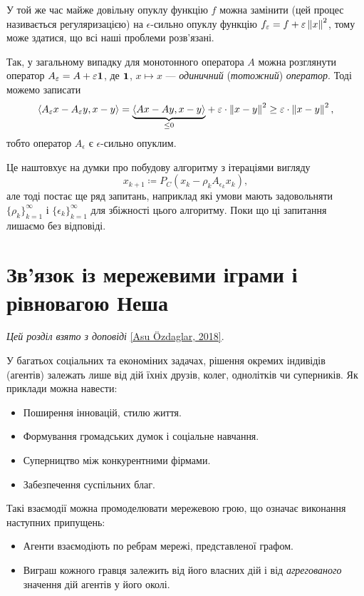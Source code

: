 У той же час майже довільну опуклу функцію $f$ можна замінити (цей процес називається регуляризацією) на $\epsilon$-сильно опуклу функцію $f_\epsilon = f + \epsilon\no{x}^2$, тому може здатися, що всі наші проблеми розв'язані. \medskip

Так, у загальному випадку для монотонного оператора $A$ можна розглянути оператор $A_\epsilon = A + \epsilon {\bf 1}$, де ${\bf 1}$, $x \mapsto x$ --- \emph{одиничний} (\emph{тотожний}) \emph{оператор}. Тоді можемо записати
\begin{equation}
    \sp{A_\epsilon x - A_\epsilon y, x - y} = \underset{\le 0}{\underbrace{\sp{A x - A y, x - y}}} + \epsilon \cdot \no{x - y}^2 \ge \epsilon \cdot \no{x - y}^2,
\end{equation}
тобто оператор $A_\epsilon$ є $\epsilon$-сильно опуклим. \medskip

Це наштовхує на думки про побудову алгоритму з ітераціями вигляду
\begin{equation}
    x_{k + 1} \coloneqq P_C \left( x_k - \rho_k A_{\epsilon_k} x_k \right),
\end{equation}
але тоді постає ще ряд запитань, наприклад які умови мають задовольняти $\{\rho_k\}_{k = 1}^\infty$ і $\{\epsilon_k\}_{k = 1}^\infty$ для збіжності цього алгоритму. Поки що ці запитання лишаємо без відповіді.

\section{Зв'язок із мережевими іграми і рівновагою Неша}

\emph{Цей розділ взято з доповіді} \href{https://simons.berkeley.edu/talks/asu-ozdaglar-3-28-18}{[Asu \"Ozdaglar, 2018]}. \medskip

У багатьох соціальних та економіних задачах, рішення окремих індивідів (агентів) залежать лише від дій їхніх друзів, колег, однолітків чи суперників. Як приклади можна навести:
\begin{itemize}
    \item Поширення інновацій, стилю життя.
    \item Формування громадських думок і соціальне навчання.
    \item Суперництво між конкурентними фірмами.
    \item Забезпечення суспільних благ.
\end{itemize}

Такі взаємодії можна промоделювати мережевою грою, що означає виконання наступних припущень:
\begin{itemize}
    \item Агенти взаємодіють по ребрам мережі, представленої графом.
    \item Виграш кожного гравця залежить від його власних дій і від \emph{агрегованого} значення дій агентів у його околі.
\end{itemize}

